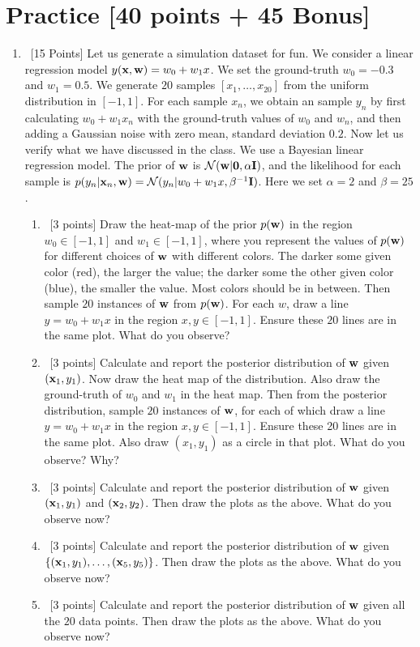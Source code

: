 \documentclass[12pt, fullpage,letterpaper]{article}
\begin{document}
\section*{Practice [40 points + 45 Bonus]}
\begin{enumerate}
	\item~[15 Points] Let us generate a simulation dataset for fun. We consider a linear regression model $y({\bf x}, {\bf w}) = w_0 + w_1 x$. We set the ground-truth $w_0 = -0.3$ and $w_1 = 0.5$. We generate $20$ samples $[x_1, \ldots, x_{20}]$ from the uniform distribution in $[-1, 1]$. For each sample $x_n$, we obtain an sample $y_n$ by first calculating $w_0 + w_1 x_n$ with the ground-truth values of $w_0$ and $w_n$, and then adding a Gaussian noise with zero mean, standard deviation $0.2$. Now let us verify what we have discussed in the class. We use a Bayesian linear regression model. The prior of ${\bf w}$ is $\mathcal{N}({\bf w}|{\bf 0}, \alpha {\bf I})$, and the likelihood for each sample is $p(y_n|{\bf x}_n, {\bf w}) = \mathcal{N}(y_n|w_0 + w_1x, \beta^{-1}{\bf I})$. Here we set $\alpha = 2$ and $\beta = 25$. 
	\begin{enumerate}
		\item~[3 points] Draw the heat-map of the prior $p({\bf w})$ in the region $w_0 \in [-1, 1]$ and $w_1 \in [-1, 1]$, where you represent the values of $p({\bf w})$ for different choices of ${\bf w}$ with different colors. The darker some given color (\eg red), the larger the value; the darker some the other given color (\eg blue), the smaller the value.  Most colors should be in between. Then sample $20$ instances of ${\bf w}$ from $p({\bf w})$. For each $w$, draw a line $y = w_0 + w_1x$ in the region $x, y \in [-1, 1]$. Ensure these $20$ lines are in the same plot. What do you observe?
		\item~[3 points] Calculate and report the posterior distribution of ${\bf w}$ given $({\bf x}_1, y_1)$. Now draw the heat map of the distribution. Also draw the ground-truth of $w_0$ and $w_1$ in the heat map.  Then from the posterior distribution, sample $20$ instances of ${\bf w}$, for each of which draw a line  $y = w_0 + w_1x$ in the region $x, y \in [-1, 1]$. Ensure these 20 lines are in the same plot. Also draw $(x_1, y_1)$ as a circle in that plot. What do you observe? Why?
		\item~[3 points] Calculate and report the posterior distribution of ${\bf w}$ given $({\bf x}_1, y_1)$ and $({\bf x}_2, y_2)$. Then draw the plots as the above. What do you observe now?  
		\item~[3 points] Calculate and report the posterior distribution of ${\bf w}$ given $\{({\bf x}_1, y_1), \ldots, ({\bf x}_5, y_5)\}$. Then draw the plots as the above. What do you observe now? 
		\item~[3 points] Calculate and report the posterior distribution of ${\bf w}$ given all the $20$ data points. Then draw the plots as the above. What do you observe now?  
	\end{enumerate}
	

\end{enumerate}
\end{document}
